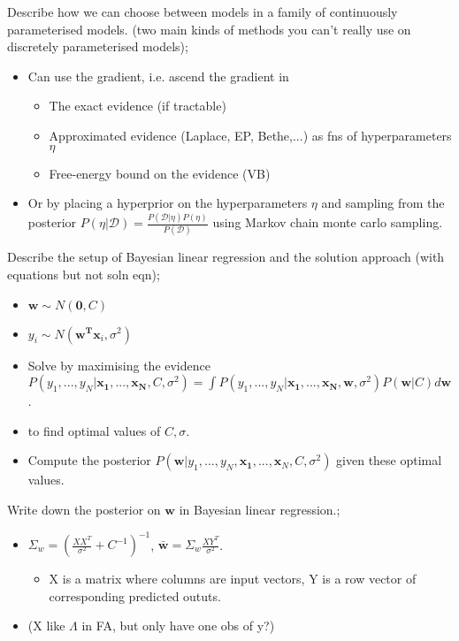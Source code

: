 \documentclass{article}
\begin{document}
Describe how we can choose between models in a family of continuously parameterised models. (two main kinds of methods you can't really use on discretely parameterised models); \begin{itemize} \item Can use the gradient, i.e. ascend the gradient in \begin{itemize} \item The exact evidence (if tractable) \item Approximated evidence (Laplace, EP, Bethe,...) as fns of hyperparameters $\eta$ \item Free-energy bound on the evidence (VB) \end{itemize} \item Or by placing a hyperprior on the hyperparameters $\eta$ and sampling from the posterior $P(\eta|\mathcal{D})=\frac{P(\mathcal{D}|\eta)P(\eta)}{P(\mathcal{D})}$ using Markov chain monte carlo sampling.  \end{itemize} 


Describe the setup of Bayesian linear regression and the solution approach (with equations but not soln eqn); \begin{itemize} \item $\mathbf{w}\sim N(\mathbf{0}, C)$ \item $y_i\sim N(\mathbf{w^Tx}_i, \sigma^2)$ \item Solve by maximising the evidence $P(y_1,...,y_N|\mathbf{x_1,...,x_N}, C, \sigma^2)=\int P(y_1,...,y_N|\mathbf{x_1,...,x_N,w}, \sigma^2)P(\mathbf{w}|C)d\mathbf{w}$.  \item to find optimal values of $C, \sigma$.  \item Compute the posterior $P(\mathbf{w}|y_1,...,y_N,\mathbf{x_1},...,\mathbf{x}_N, C, \sigma^2)$ given these optimal values.  \end{itemize}

Write down the posterior on $\mathbf{w}$ in Bayesian linear regression.; \begin{itemize} \item $\Sigma_w = (\frac{XX^T}{\sigma^2}+C^{-1})^{-1}$, $\mathbf{\bar{w}}=\Sigma_w\frac{XY^T}{\sigma^2}$.  \begin{itemize} \item X is a matrix where columns are input vectors, Y is a row vector of corresponding predicted oututs.  \end{itemize} \item (X like $\Lambda$ in FA, but only have one obs of y?) \end{itemize}
\end{document}
